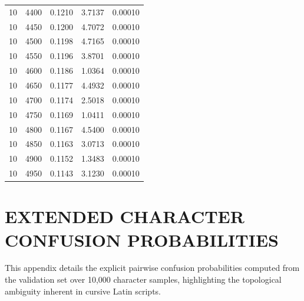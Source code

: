 \begin{longtable}{ccccc}
    10 & 4400 & 0.1210 & 3.7137 & 0.00010 \\
    10 & 4450 & 0.1200 & 4.7072 & 0.00010 \\
    10 & 4500 & 0.1198 & 4.7165 & 0.00010 \\
    10 & 4550 & 0.1196 & 3.8701 & 0.00010 \\
    10 & 4600 & 0.1186 & 1.0364 & 0.00010 \\
    10 & 4650 & 0.1177 & 4.4932 & 0.00010 \\
    10 & 4700 & 0.1174 & 2.5018 & 0.00010 \\
    10 & 4750 & 0.1169 & 1.0411 & 0.00010 \\
    10 & 4800 & 0.1167 & 4.5400 & 0.00010 \\
    10 & 4850 & 0.1163 & 3.0713 & 0.00010 \\
    10 & 4900 & 0.1152 & 1.3483 & 0.00010 \\
    10 & 4950 & 0.1143 & 3.1230 & 0.00010 \\
\end{longtable}

\newpage
\chapter{EXTENDED CHARACTER CONFUSION PROBABILITIES}
\label{ch:appendixF}
This appendix details the explicit pairwise confusion probabilities computed from the validation set over 10,000 character samples, highlighting the topological ambiguity inherent in cursive Latin scripts.

